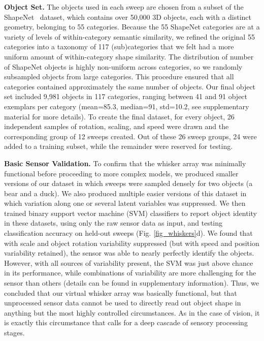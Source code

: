 \textbf{Object Set.} The objects used in each sweep are chosen from a subset of the ShapeNet~\cite{Chang2015} dataset, which contains over 50,000 3D objects, each with a distinct geometry, belonging to 55 categories.
Because the 55 ShapeNet categories are at a variety of levels of within-category semantic similarity, we refined the original 55 categories into a taxonomy of 117 (sub)categories that we felt had a more uniform amount of within-category shape similarity. 
The distribution of number of ShapeNet objects is highly non-uniform across categories, so we randomly subsampled objects from large categories.  
This procedure ensured that all categories contained approximately the same number of objects.  
Our final object set included 9,981 objects in 117 categories, ranging between 41 and 91 object exemplars per category (mean=85.3, median=91, std=10.2, see supplementary material for more details). 
To create the final dataset, for every object, 26 independent samples of rotation, scaling, and speed were drawn and the corresponding group of 12 sweeps created.   
Out of these 26 sweep groups, 24 were added to a training subset, while the remainder were reserved for testing.

\textbf{Basic Sensor Validation.} To confirm that the whisker array was minimally functional before proceeding to more complex models, we produced smaller versions of our dataset in which sweeps were sampled densely for two objects (a bear and a duck).  
We also produced multiple easier versions of this dataset in which variation along one or several latent variables was suppressed. 
We then trained binary support vector machine (SVM) classifiers to report object identity in these datasets, using only the raw sensor data as input, and testing classification accuracy on held-out sweeps (Fig. \ref{fig_whiskers}d).  We found that with scale and object rotation variability suppressed (but with speed and position variability retained), the sensor was able to nearly perfectly identify the objects.  
However, with all sources of variability present, the SVM was just above chance in its performance,  
while combinations of variability are more challenging for the sensor than others (details can be found in supplementary information). 
Thus, we concluded that our virtual whisker array was basically functional, but that unprocessed sensor data cannot be used to directly read out object shape in anything but the most highly controlled circumstances.
As in the case of vision, it is exactly this circumstance that calls for a deep cascade of sensory processing stages. 

